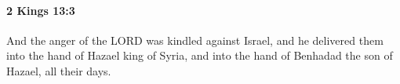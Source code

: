 
		\paragraph{2 Kings 13:3} %
			\label{2KINGS-13-3}

			And the anger of the LORD was kindled against Israel, and he delivered them into the hand of Hazael king of Syria, and into the hand of Benhadad the son of Hazael, all their days.


